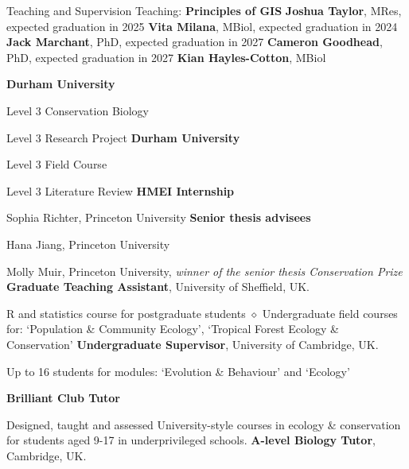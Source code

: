 \begin{rubric}{Teaching and Supervision}
\entry*[2023-present] Teaching: \textbf{Principles of GIS}
\entry*[2024-present] \textbf{Joshua Taylor}, MRes, expected graduation in 2025
\entry*[2023-present] \textbf{Vita Milana}, MBiol, expected graduation in 2024
\entry*[2023-present] \textbf{Jack Marchant}, PhD, expected graduation in 2027
\entry*[2023-present] \textbf{Cameron Goodhead}, PhD, expected graduation in 2027
\entry*[2022-2023] \textbf{Kian Hayles-Cotton}, MBiol


\entry*[2023-present] \textbf{Durham University}
	\par Level 3 Conservation Biology
	\par Level 3 Research Project
\entry*[2022-present] \textbf{Durham University}
	\par Level 3 Field Course
	\par Level 3 Literature Review
\entry*[2021] \textbf{HMEI Internship}
	\par Sophia Richter, Princeton University
\entry*[2019 -- 2021] \textbf{Senior thesis advisees}
	\par Hana Jiang, Princeton University
	\par Molly Muir, Princeton University, \emph{winner of the senior thesis Conservation Prize}
\entry*[2014 -- 2018] \textbf{Graduate Teaching Assistant}, University of Sheffield, UK.
	\par R and statistics course for postgraduate students $\diamond$ Undergraduate field courses for: `Population \& Community Ecology', `Tropical Forest Ecology \& Conservation'
\entry*[2013 -- 2014] \textbf{Undergraduate Supervisor}, University of Cambridge, UK.
	\par Up to 16 students for modules: `Evolution \& Behaviour' and  `Ecology'


\entry*[2017 -- 2021] \textbf{Brilliant Club Tutor}
	\par Designed, taught and assessed University-style courses in ecology \& conservation for students aged 9-17 in underprivileged schools.
\entry*[2013 -- 2014] \textbf{A-level Biology Tutor}, Cambridge, UK.

\end{rubric}
